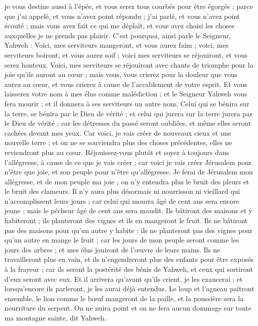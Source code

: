 \begin{multicols}{2}
je vous destine aussi à l'épée, et vous serez tous courbés pour être égorgés ; parce que j'ai appelé, et vous n'avez point répondu ; j'ai parlé, et vous n'avez point écouté ; mais vous avez fait ce qui me déplaît, et vous avez choisi les choses auxquelles je ne prends pas plaisir.
C'est pourquoi, ainsi parle le Seigneur, Yahweh : Voici, mes serviteurs mangeront, et vous aurez faim ; voici, mes serviteurs boiront, et vous aurez soif ; voici mes serviteurs se réjouiront, et vous serez honteux.
Voici, mes serviteurs se réjouiront avec chants de triomphe pour la joie qu'ils auront au cœur ; mais vous, vous crierez pour la douleur que vous aurez au cœur, et vous crierez à cause de l'accablement de votre esprit.
Et vous laisserez votre nom à mes élus comme malédiction ; et le Seigneur Yahweh vous fera mourir ; et il donnera à ses serviteurs un autre nom.
Celui qui se bénira sur la terre, se bénira par le Dieu de vérité ; et celui qui jurera sur la terre jurera par le Dieu de vérité ; car les détresses du passé seront oubliées, et même elles seront cachées devant mes yeux.
Car voici, je vais créer de nouveaux cieux et une nouvelle terre ; et on ne se souviendra plus des choses précédentes, elles ne reviendront plus au cœur.
Réjouissez-vous plutôt et soyez à toujours dans l'allégresse, à cause de ce que je vais créer ; car voici je vais créer Jérusalem pour n'être que joie, et son peuple pour n'être qu'allégresse.
Je ferai de Jérusalem mon allégresse, et de mon peuple ma joie ; on n'y entendra plus le bruit des pleurs et le bruit des clameurs.
Il n'y aura plus désormais ni nourrisson ni vieillard qui n'accomplissent leurs jours ; car celui qui mourra âgé de cent ans sera encore jeune ; mais le pécheur âgé de cent ans sera maudit.
Ils bâtiront des maisons et y habiteront ; ils planteront des vignes et ils en mangeront le fruit.
Ils ne bâtiront pas des maisons pour qu'un autre y habite ; ils ne planteront pas des vignes pour qu'un autre en mange le fruit ; car les jours de mon peuple seront comme les jours des arbres ; et mes élus jouiront de l'œuvre de leurs mains.
Ils ne travailleront plus en vain, et ils n'engendreront plus des enfants pour être exposés à la frayeur ; car ils seront la postérité des bénis de Yahweh, et ceux qui sortiront d'eux seront avec eux.
Et il arrivera qu'avant qu'ils crient, je les exaucerai ; et lorsqu'encore ils parleront, je les aurai déjà entendus.
Le loup et l'agneau paîtront ensemble, le lion comme le bœuf mangeront de la paille, et la poussière sera la nourriture du serpent. On ne nuira point et on ne fera aucun dommage sur toute ma montagne sainte, dit Yahweh.

\end{multicols}
